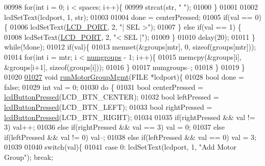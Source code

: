\begin{DoxyCode}
{{{{{{{{{{{{{{00998         \textcolor{keywordflow}{for}(\textcolor{keywordtype}{int} i = 0; i < spaces; i++)\{
00999             strcat(str, \textcolor{stringliteral}{" "});
01000         \}
01001 
01002         lcdSetText(lcdport, 1, str);
01003 
01004         done = centerPressed;
01005         \textcolor{keywordflow}{if}(val == 0)\{
01006             lcdSetText(\hyperlink{lcdmsg_8h_abcf42bd88b3c36193f301ca25b033875}{LCD\_PORT}, 2, \textcolor{stringliteral}{"|      SEL     >"});
01007         \} \textcolor{keywordflow}{else} \textcolor{keywordflow}{if}(val == 1) \{
01008             lcdSetText(\hyperlink{lcdmsg_8h_abcf42bd88b3c36193f301ca25b033875}{LCD\_PORT}, 2, \textcolor{stringliteral}{"<      SEL     |"});
01009         \}
01010         delay(20);
01011     \} \textcolor{keywordflow}{while}(!done);
01012     \textcolor{keywordflow}{if}(val)\{
01013         memset(&groups[mtr], 0, \textcolor{keyword}{sizeof}(groups[mtr]));
01014         \textcolor{keywordflow}{for}(\textcolor{keywordtype}{int} i = mtr; i < \hyperlink{lcddiag_8c_a205f1cedec1664555276e0a71a1c87d8}{numgroups} - 1; i++)\{
01015             memcpy(&groups[i], &groups[i+1], \textcolor{keyword}{sizeof}(groups[i]));
01016         \}
01017         numgroups--;
01018     \}
01019 \}
01020 
\hypertarget{lcddiag_8c_source.tex_l01027}{}\hyperlink{lcddiag_8c_a9c8ce3f638a12bc9a264dd447be96a6d}{01027} \textcolor{keywordtype}{void} \hyperlink{lcddiag_8c_a9c8ce3f638a12bc9a264dd447be96a6d}{runMotorGroupMgmt}(FILE *lcdport)\{
01028     \textcolor{keywordtype}{bool} done = \textcolor{keyword}{false};
01029     \textcolor{keywordtype}{int} val = 0;
01030     \textcolor{keywordflow}{do} \{
01031         \textcolor{keywordtype}{bool} centerPressed = \hyperlink{lcddiag_8h_a74e4c744db49f9b7b645095575e152ad}{lcdButtonPressed}(LCD\_BTN\_CENTER);
01032         \textcolor{keywordtype}{bool} leftPressed = \hyperlink{lcddiag_8h_a74e4c744db49f9b7b645095575e152ad}{lcdButtonPressed}(LCD\_BTN\_LEFT);
01033         \textcolor{keywordtype}{bool} rightPressed = \hyperlink{lcddiag_8h_a74e4c744db49f9b7b645095575e152ad}{lcdButtonPressed}(LCD\_BTN\_RIGHT);
01034 
01035         \textcolor{keywordflow}{if}(rightPressed && val != 3) val++;
01036         \textcolor{keywordflow}{else} \textcolor{keywordflow}{if}(rightPressed && val == 3) val = 0;
01037         \textcolor{keywordflow}{else} \textcolor{keywordflow}{if}(leftPressed && val != 0) val--;
01038         \textcolor{keywordflow}{else} \textcolor{keywordflow}{if}(leftPressed && val == 0) val = 3;
01039 
01040         \textcolor{keywordflow}{switch}(val)\{
01041             \textcolor{keywordflow}{case} 0: lcdSetText(lcdport, 1, \textcolor{stringliteral}{"Add Motor Group"}); \textcolor{keywordflow}{break};
}}}}}}}}}}}}}}
\end{DoxyCode}
